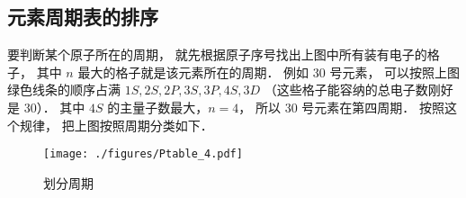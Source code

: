 \subsection{元素周期表的排序}

要判断某个原子所在的周期， 就先根据原子序号找出上图中所有装有电子的格子， 其中 $n$ 最大的格子就是该元素所在的周期． 例如 30 号元素， 可以按照上图绿色线条的顺序占满 $1S, 2S, 2P, 3S, 3P, 4S, 3D$ （这些格子能容纳的总电子数刚好是 30）． 其中 $4S$ 的主量子数最大，$n=4$， 所以 30 号元素在第四周期． 按照这个规律， 把上图按照周期分类如下．
\begin{figure}[ht]
\centering
\texttt{[image: ./figures/Ptable\_4.pdf]}
\caption{划分周期} 
\end{figure}

